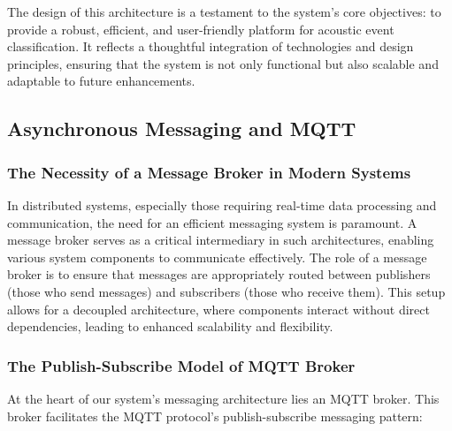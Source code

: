 The design of this architecture is a testament to the system's core objectives: to provide a robust, efficient, and user-friendly platform for acoustic event classification. It reflects a thoughtful integration of technologies and design principles, ensuring that the system is not only functional but also scalable and adaptable to future enhancements.

\subsection{Asynchronous Messaging and MQTT}
\subsubsection{The Necessity of a Message Broker in Modern Systems}
In distributed systems, especially those requiring real-time data processing and communication, the need for an efficient messaging system is paramount. A message broker serves as a critical intermediary in such architectures, enabling various system components to communicate effectively. The role of a message broker is to ensure that messages are appropriately routed between publishers (those who send messages) and subscribers (those who receive them). This setup allows for a decoupled architecture, where components interact without direct dependencies, leading to enhanced scalability and flexibility.

\subsubsection{The Publish-Subscribe Model of MQTT Broker}
At the heart of our system's messaging architecture lies an MQTT broker. This broker facilitates the MQTT protocol's publish-subscribe messaging pattern:

